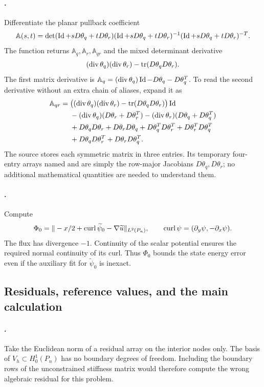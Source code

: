 \paragraph{.}
Differentiate the planar pullback coefficient
\[
 \mathbb A(s,t)=\det(\operatorname{Id}+sD\theta_q+tD\theta_r)
 (\operatorname{Id}+sD\theta_q+tD\theta_r)^{-1}
 (\operatorname{Id}+sD\theta_q+tD\theta_r)^{-T}.
\]
The function returns $\mathbb A_q,\mathbb A_r,\mathbb A_{qr}$ and
the mixed determinant derivative
\[
 (\operatorname{div}\theta_q)(\operatorname{div}\theta_r)
                          -\operatorname{tr}(D\theta_qD\theta_r).
\]
The first matrix derivative is
$\mathbb A_q=(\operatorname{div}\theta_q)\operatorname{Id}-D\theta_q-D\theta_q^T$.
To read the second derivative without an extra chain of aliases, expand it
as
\begin{align*}
 \mathbb A_{qr}={}&
 \bigl((\operatorname{div}\theta_q)(\operatorname{div}\theta_r)
                       -\operatorname{tr}(D\theta_qD\theta_r)\bigr)\operatorname{Id}\\
 &-(\operatorname{div}\theta_q)(D\theta_r+D\theta_r^T)
  -(\operatorname{div}\theta_r)(D\theta_q+D\theta_q^T)\\
 &+D\theta_qD\theta_r+D\theta_rD\theta_q
  +D\theta_q^TD\theta_r^T+D\theta_r^TD\theta_q^T\\
 &+D\theta_qD\theta_r^T+D\theta_rD\theta_q^T.
\end{align*}
The source stores each symmetric matrix in three entries. Its temporary
four-entry arrays named  and  are simply the row-major
Jacobians $D\theta_q,D\theta_r$; no additional mathematical quantities
are needed to understand them.

\paragraph{.}
Compute
\[
 \Phi_0=\|-x/2+\operatorname{curl}\widetilde\psi_0-\nabla\widetilde u\|_{L^2(P_n)},
 \qquad \operatorname{curl}\psi=(\partial_y\psi,-\partial_x\psi).
\]
The flux has divergence $-1$. Continuity of the scalar potential ensures
the required normal continuity of its curl. Thus $\Phi_0$ bounds the
state energy error even if the auxiliary fit for $\widetilde\psi_0$ is
inexact.

\subsection{Residuals, reference values, and the main calculation}
\paragraph{.}
Take the Euclidean norm of a residual array on the interior nodes only.
The basis of $V_h\subset H^1_0(P_n)$ has no boundary degrees of freedom.
Including the boundary rows of the unconstrained stiffness matrix would
therefore compute the wrong algebraic residual for this problem.

